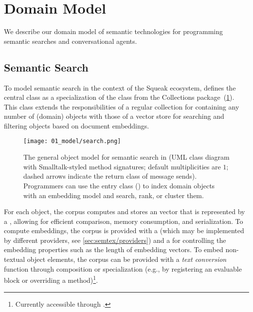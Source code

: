 
\section{Domain Model}
\label{sec:semtex/model}

We describe our domain model of semantic technologies for programming semantic searches and conversational agents.

\subsection*{Semantic Search}
\label{sec:semtex/model/search}

To model semantic search in the context of the Squeak ecosystem, \semtex defines the central class  as a specialization of the  class from the Collections package~(\cref{fig:semtex/model/search}).
This class extends the responsibilities of a regular collection for containing any number of (domain) objects with those of a vector store for searching and filtering objects based on document embeddings.

\begin{figure}
	\centering
	\texttt{[image: 01\_model/search.png]}
	\caption[The general object model for semantic search in \semtex.]{
		The general object model for semantic search in \semtex (UML class diagram with Smalltalk-styled method signatures; default multiplicities are $1$; dashed arrows indicate the return class of message sends).
		Programmers can use the entry class  (\bold{\textcolor{red}{red}}) to index domain objects with an embedding model and search, rank, or cluster them.
	}
	\label{fig:semtex/model/search}
\end{figure}

For each object, the corpus computes and stores an  vector that is represented by a , allowing for efficient comparison, memory consumption, and serialization.
To compute embeddings, the corpus is provided with a  (which may be implemented by different providers, see \cref{sec:semtex/providers}) and a  for controlling the embedding properties such as the length of embedding vectors.
To embed non-textual object elements, the corpus can be provided with a \emph{text conversion} function through composition or specialization (e.g., by registering an evaluable block or overriding a method)\footnote{Currently accessible through .}.

